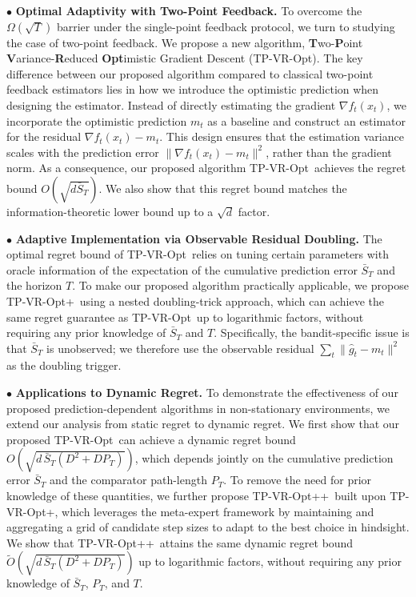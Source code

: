 \documentclass[journal,onecolumn]{IEEEtran}
\theoremstyle{plain}
\theoremstyle{definition}
\theoremstyle{remark}
\newcommand{\tpvr}{{\sc TP-VR-Opt}}
\newcommand{\tpvrplus}{{\sc TP-VR-Opt+}}
\newcommand{\tpvrplusplus}{{\sc TP-VR-Opt++}}
\begin{document}
$\bullet$  \textbf{Optimal Adaptivity with Two-Point Feedback.} To overcome the $\Omega(\sqrt{T})$ barrier under the single-point feedback protocol, we turn to studying the case of two-point feedback. We propose a new algorithm, \textbf{T}wo-\textbf{P}oint \textbf{V}ariance-\textbf{R}educed \textbf{Opt}imistic Gradient Descent (\tpvr). The key difference between our proposed algorithm compared to classical two-point feedback estimators lies in how we introduce the optimistic prediction when designing the estimator. Instead of directly estimating the gradient $\nabla f_t(x_t)$, we incorporate the optimistic prediction $m_t$ as a baseline and construct an estimator for the residual $\nabla f_t(x_t)-m_t$. This design ensures that the estimation variance scales with the prediction error $\|\nabla f_t(x_t)-m_t\|^2$, rather than the gradient norm. As a consequence, our proposed algorithm \tpvr\, achieves the regret bound $O(\sqrt{d\bar S_T})$. We also show that this regret bound  matches the information-theoretic lower bound  up to a 
$\sqrt{d}$ factor. 

$\bullet$  \textbf{Adaptive Implementation via Observable Residual Doubling.} The optimal regret bound of \tpvr\, relies on  tuning certain parameters with oracle information of the expectation of the cumulative prediction error $\bar S_T$ and the horizon $T$. To make our proposed algorithm practically applicable, we propose \tpvrplus\, using a nested doubling-trick approach, which can achieve the same regret guarantee as \tpvr\, up to logarithmic factors, without requiring any prior knowledge of $\bar S_T$ and $T$. Specifically, the bandit-specific issue
is that $\bar S_T$ is unobserved; we therefore use the observable residual
$\sum_t\|\widehat g_t-m_t\|^2$ as the doubling trigger.

$\bullet$  \textbf{Applications to Dynamic Regret.} To demonstrate the effectiveness of our proposed prediction-dependent algorithms in non-stationary environments, we extend our analysis from static regret to dynamic regret. We first show that our proposed \tpvr\, can achieve a dynamic regret bound $O(\sqrt{d\,\bar{S}_{T}(D^{2}+D P_{T})})$, which depends jointly on the cumulative prediction error $\bar S_T$ and the comparator path-length $P_T$. To remove the need for prior knowledge of these quantities, we further propose \tpvrplusplus\, built upon \tpvrplus, which leverages the meta-expert framework by maintaining and aggregating a grid of candidate step sizes to adapt to the best choice in hindsight. We show that \tpvrplusplus\, attains the same dynamic regret bound $\tilde{O}(\sqrt{d\,\bar{S}_{T}(D^{2}+D P_{T})})$
up to logarithmic factors, without requiring any prior knowledge of $\bar S_T$, $P_T$, and $T$.
\end{document}
